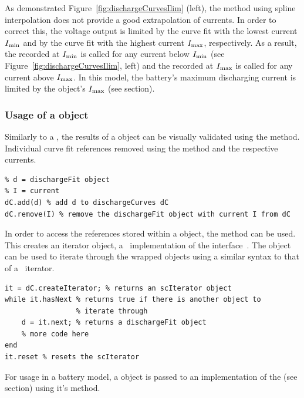 As demonstrated Figure~\ref{fig:dischargeCurvesIlim} (left), the  method using spline interpolation does not provide a good extrapolation of currents. In order to correct this, the voltage output is limited by the curve fit with the lowest current $I_\text{min}$ and by the curve fit with the highest current $I_\text{max}$, respectively. As a result, the  recorded at $I_\text{min}$ is called for any current below $I_\text{min}$ (see Figure~\ref{fig:dischargeCurvesIlim}, left) and the  recorded at $I_\text{max}$ is called for any current above $I_\text{max}$. In this model, the battery's maximum discharging current is limited by the  object's $I_\text{max}$ (see section).

\subsubsection{Usage of a  object}
Similarly to a , the results of a  object can be visually validated using the  method. Individual curve fit references removed using the  method and the respective currents. \clearpage
\begin{lstlisting}
% d = dischargeFit object
% I = current
dC.add(d) % add d to dischargeCurves dC
dC.remove(I) % remove the dischargeFit object with current I from dC
\end{lstlisting}
In order to access the  references stored within a  object, the  method can be used. This creates an iterator object, a \matlab\ implementation of the  interface~\cite{_iterator_????}. The object can be used to iterate through the wrapped  objects using a similar syntax to that of a \java\ iterator.
\begin{lstlisting}
it = dC.createIterator; % returns an scIterator object
while it.hasNext % returns true if there is another object to
				 % iterate through
	d = it.next; % returns a dischargeFit object
	% more code here
end
it.reset % resets the scIterator
\end{lstlisting}
For usage in a battery model, a  object is passed to an implementation of the  (see section) using it's  method.